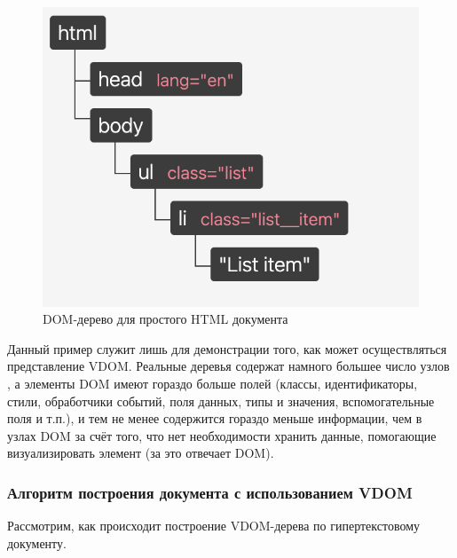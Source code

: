 \begin{figure}[h]
	\centering
	\includegraphics[width=140mm]{img/dom-to-vdom-dom.png}
	\caption{DOM-дерево для простого HTML документа}
	\label{fig:dom-to-vdom-dom}
\end{figure}


Данный пример служит лишь для демонстрации того, как может осуществляться представление VDOM. 
Реальные деревья содержат намного большее число узлов \cite{dom-element}, а элементы DOM имеют гораздо больше полей (классы, идентификаторы, стили, обработчики событий, поля данных, типы и значения, вспомогательные поля и т.п.), и тем не менее содержится гораздо меньше информации, чем в узлах DOM за счёт того, что нет необходимости хранить данные, помогающие визуализировать элемент (за это отвечает DOM).

\subsubsection{Алгоритм построения документа с использованием VDOM}

Рассмотрим, как происходит построение VDOM-дерева по гипертекстовому документу.

